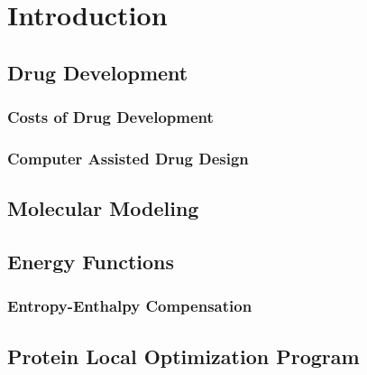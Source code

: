 \chapter{Introduction}
\label{chapter:intro}

\section{Drug Development}
\label{section:drug_development}

\subsection{Costs of Drug Development}
\label{subsection:costs_of_drug_development}


\subsection{Computer Assisted Drug Design}
\label{subsection:computer_assisted_drug_design}


\section{Molecular Modeling}
\label{section:molecular_modeling}

\section{Energy Functions}
\label{section:energy_functions}

\subsection{Entropy-Enthalpy Compensation}
\label{subsection:entropy_enthalpy}

\section{Protein Local Optimization Program}
\label{section:protein_local_optimization_program}
